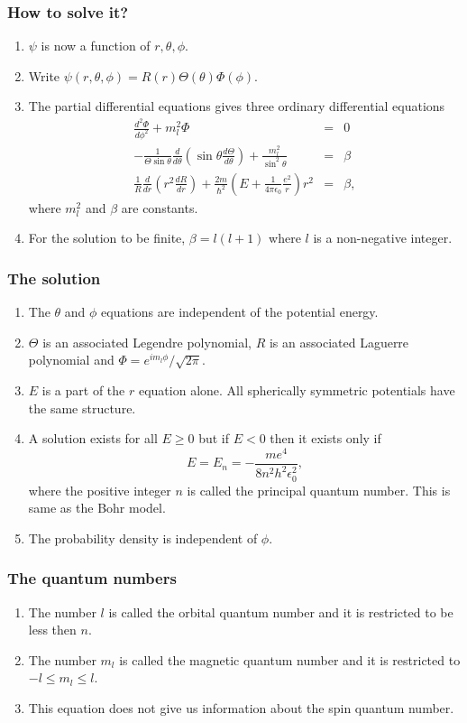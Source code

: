 \documentclass{beamer}
\begin{document}
\begin{frame}
\frametitle{How to solve it?}
\begin{enumerate}
\item $\psi$ is now a function of $r, \theta, \phi$.
\item Write $\psi(r, \theta, \phi) = R(r)\Theta(\theta)\Phi(\phi)$.
\item The partial differential equations gives three ordinary differential 
equations
\begin{eqnarray}
\frac{d^2\Phi}{d\phi^2} + m_l^2\Phi &=& 0 \label{e5} \\
-\frac{1}{\Theta\sin\theta}\frac{d}{d\theta}
\left(\sin\theta\frac{d\Theta}{d\theta}\right) +\frac{m_l^2}{\sin^2\theta} &=& 
\beta \label{e6} \\
\frac{1}{R}\frac{d}{dr}\left(r^2\frac{dR}{dr}\right) +
\frac{2m}{\hslash^2}\left(E + \frac{1}{4\pi\epsilon_0}\frac{e^2}{r}\right)r^2&=&
\beta, \label{e7}
\end{eqnarray}
where $m_l^2$ and $\beta$ are constants.
\item For the solution to be finite, $\beta = l(l+1)$ where $l$ is a non-negative
integer.
\end{enumerate}
\end{frame}

\begin{frame}
\frametitle{The solution}
\begin{enumerate}
\item The $\theta$ and $\phi$ equations are independent of the potential energy.
\item $\Theta$ is an associated Legendre polynomial, $R$ is an associated 
Laguerre polynomial and $\Phi = e^{im_l\phi}/\sqrt{2\pi}$.
\item $E$ is a part of the $r$ equation alone. All spherically symmetric 
potentials have the same structure.
\item A solution exists for all $E \ge 0$ but if $E < 0$ then it exists only if
\begin{equation}\label{e8}
E = E_n = -\frac{me^4}{8n^2h^2\epsilon_0^2},
\end{equation}
where the positive integer $n$ is called the principal quantum number. This is 
same as the Bohr model.
\item The probability density is independent of $\phi$.

\end{enumerate}
\end{frame}

\begin{frame}
\frametitle{The quantum numbers}
\begin{enumerate}
\item The number $l$ is called the orbital quantum number and it is restricted
to be less then $n$.
\item The number $m_l$ is called the magnetic quantum number and it is restricted
to $-l \le m_l \le l$.
\item This equation does not give us information about the spin quantum number.
\end{enumerate}
\end{frame}
\end{document}
